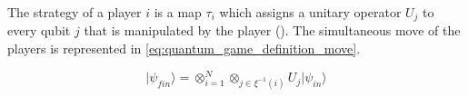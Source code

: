The strategy of a player $i$ is a map $\tau_{i}$ which assigns a
unitary operator $U_{j}$ to every qubit $j$ that is manipulated
by the player ().
The simultaneous move of the players is represented in \ref{eq:quantum_game_definition_move}.

\begin{equation}
\vert\psi_{fin}\rangle=\otimes_{i=1}^{N}\otimes_{j\in\xi^{-1}(i)}U_{j}\vert\psi_{in}\rangle\label{eq:quantum_game_definition_move}
\end{equation}
